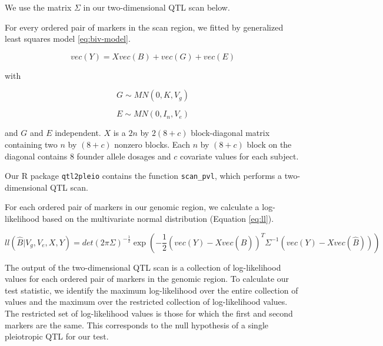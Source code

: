 \documentclass{book}
\begin{document}
We use the matrix $\Sigma$ in our two-dimensional QTL scan below.




For every ordered pair of markers in the scan region, we fitted by generalized least squares model \ref{eq:biv-model}.

\begin{equation}
vec(Y) = X vec(B) + vec(G) + vec(E)
\label{eq:biv-model}
\end{equation}

with 

\begin{equation}
G \sim MN(0, K, V_g)
\end{equation}

\begin{equation}
E \sim MN(0, I_n, V_e)
\end{equation}

and $G$ and $E$ independent. $X$ is a $2n$ by $2(8 + c)$ block-diagonal matrix containing two $n$ by $(8 + c)$ nonzero blocks. Each $n$ by $(8 + c)$ block on the diagonal contains $8$ founder allele dosages and $c$ covariate values for each subject.  

Our R package \texttt{qtl2pleio} contains the function \texttt{scan\_pvl}, which performs a two-dimensional QTL scan. 

For each ordered pair of markers in our genomic region, we calculate a log-likelihood based on the multivariate normal distribution (Equation \ref{eq:ll}).

\begin{equation}
ll(\hat B | V_g, V_e, X, Y) = det\left(2\pi\Sigma\right)^{-\frac{1}{2}}\exp{\left(- \frac{1}{2}(vec(Y) - Xvec(\hat B))^T\Sigma^{-1}(vec(Y) - Xvec(\hat B))\right)}
\label{eq:ll}
\end{equation}




The output of the two-dimensional QTL scan is a collection of log-likelihood values for each ordered pair of markers in the genomic region. To calculate our test statistic, we identify the maximum log-likelihood over the entire collection of values and the maximum over the restricted collection of log-likelihood values. The restricted set of log-likelihood values is those for which the first and second markers are the same. This corresponds to the null hypothesis of a single pleiotropic QTL for our test.
\end{document}
